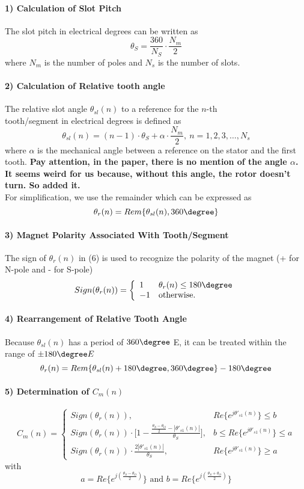 \paragraph{1) Calculation of Slot Pitch} The slot pitch in electrical degrees can be written as $$\theta_S = \frac{360}{N_S} \cdot \frac{N_m}{2}$$ where $N_m$ is the number of poles and $N_s$ is the number of slots.
\paragraph{2) Calculation of Relative tooth angle}
The relative slot angle $\theta_{sl}(n)$ to a reference for the $n$-th \\tooth/segment in electrical degrees is defined as $$\theta_{sl}(n)=(n-1) \cdot \theta_S + \alpha \cdot \frac{N_m}{2}, \ n=1,2,3,\dots,N_s$$
where $\alpha$ is the mechanical angle between a reference on the stator and the first tooth. \textbf{Pay attention, in the paper, there is no mention of the angle $\alpha$. It seems weird for us because, without this angle, the rotor doesn't turn. So added it.}\\
For simplification, we use the remainder which can be expressed as $$\theta_r(n) = Rem\{\theta_{sl}(n),360\degree\}$$
\paragraph{3) Magnet Polarity Associated With Tooth/Segment}
The sign of $\theta_r(n)$ in (6) is used to recognize the polarity of the magnet (+ for N-pole and - for S-pole)
$$
Sign(\theta_r(n)) = \left\{
    \begin{array}{ll}
        1 & \theta_r(n) \leq 180\degree \\
        -1 & \mbox{otherwise.}
    \end{array}
\right.
$$
\paragraph{4) Rearrangement of Relative Tooth Angle}
Because $\theta_{sl}(n)$ has a period of $360\degree$ E, it can be treated within the range of $\pm 180\degree E$ $$\theta_r(n) = Rem\{\theta_{sl}(n)+180\degree,360\degree\}-180\degree$$
\paragraph{5) Determination of $C_m(n)$}
$$
C_m(n) = \left\{
    \begin{array}{ll}
        Sign(\theta_r(n)), & Re\{e^{j\theta '_{s1}(n)}\}\leq b \\
        Sign(\theta_r(n)) \cdot \Big[1-\frac{\frac{\theta_S-\theta_O}{2}-|\theta '_{s1}(n)|}{\theta_S} \Big], & b \leq Re\{e^{j\theta '_{s1}(n)}\}\leq a \\
        Sign(\theta_r(n)) \cdot \frac{2|\theta '_{s1}(n)|}{\theta_S}, & Re\{e^{j\theta '_{s1}(n)}\}\geq a
    \end{array}
\right.
$$
with $$a=Re\Big\{e^{j(\frac{\theta_S-\theta_O}{2})}\Big\} \text{ and } b=Re\Big\{e^{j(\frac{\theta_S+\theta_O}{2})}\Big\} $$

